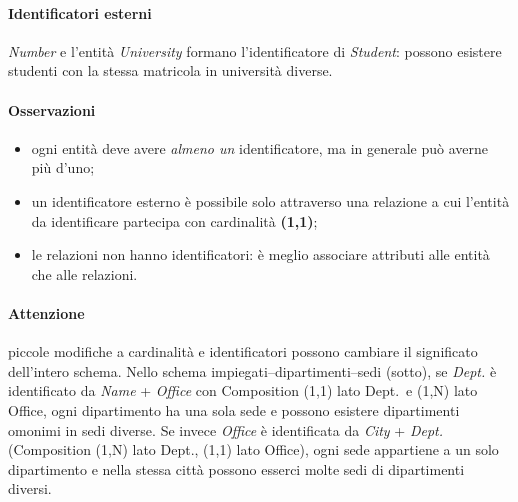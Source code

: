 \documentclass[a4paper,12pt]{article}
\begin{document}
\paragraph{Identificatori esterni} \emph{Number} e l'entità
\emph{University} formano l'identificatore di \emph{Student}: possono esistere
studenti con la stessa matricola in università diverse.
\begin{center}
\end{center}

\paragraph{Osservazioni}
\begin{itemize}
  \item ogni entità deve avere \emph{almeno un} identificatore, ma in generale
    può averne più d'uno;
  \item un identificatore esterno è possibile solo attraverso una relazione a
    cui l'entità da identificare partecipa con cardinalità \textbf{(1,1)};
  \item le relazioni non hanno identificatori: è meglio associare attributi
    alle entità che alle relazioni.
\end{itemize}

\paragraph{Attenzione} piccole modifiche a cardinalità e identificatori
possono cambiare il significato dell'intero schema. Nello schema
impiegati--dipartimenti--sedi (sotto), se \emph{Dept.} è identificato da
\emph{Name} + \emph{Office} con Composition (1,1) lato Dept.\ e (1,N) lato
Office, ogni dipartimento ha una sola sede e possono esistere dipartimenti
omonimi in sedi diverse. Se invece \emph{Office} è identificata da \emph{City}
+ \emph{Dept.} (Composition (1,N) lato Dept., (1,1) lato Office), ogni sede
appartiene a un solo dipartimento e nella stessa città possono esserci molte
sedi di dipartimenti diversi.
\end{document}
